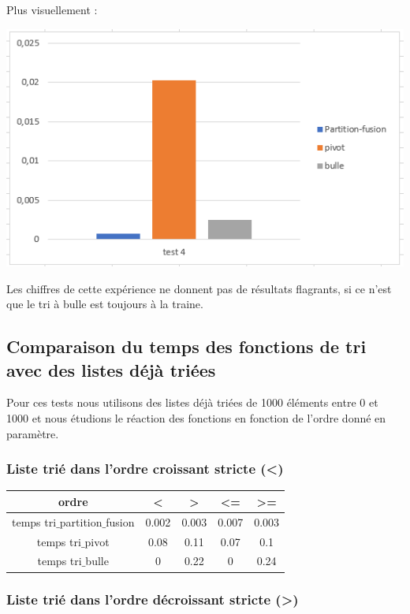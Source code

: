 \documentclass[a4paper, 12pt]{article}
\begin{document}
Plus visuellement : 
\begin{center}
\includegraphics[scale=1]{graphique/test4.PNG} 
\end{center}

Les chiffres de cette expérience ne donnent pas de résultats flagrants, si ce n'est que le tri à bulle est toujours à la traine.  
  
\subsection{Comparaison du temps des fonctions de tri avec des listes déjà triées}

Pour ces tests nous utilisons des listes déjà triées de 1000 éléments entre 0 et 1000 et nous étudions le réaction des fonctions en fonction de l'ordre donné en paramètre.

\subsubsection{Liste trié dans l'ordre croissant stricte (<)}

\begin{center}
\begin{tabular}{|c|c|c|c|c|}
\hline 
ordre & < & > & <= & >= \\ 
\hline 
temps tri$\_$partition$\_$fusion & 0.002 & 0.003 &0.007 & 0.003 \\ 
\hline 
temps tri$\_$pivot & 0.08 & 0.11 & 0.07 & 0.1\\ 
\hline 
temps tri$\_$bulle & 0 & 0.22 & 0 & 0.24 \\ 
\hline  
\end{tabular}
\end{center} 

\subsubsection{Liste trié dans l'ordre décroissant stricte (>)}
\end{document}
